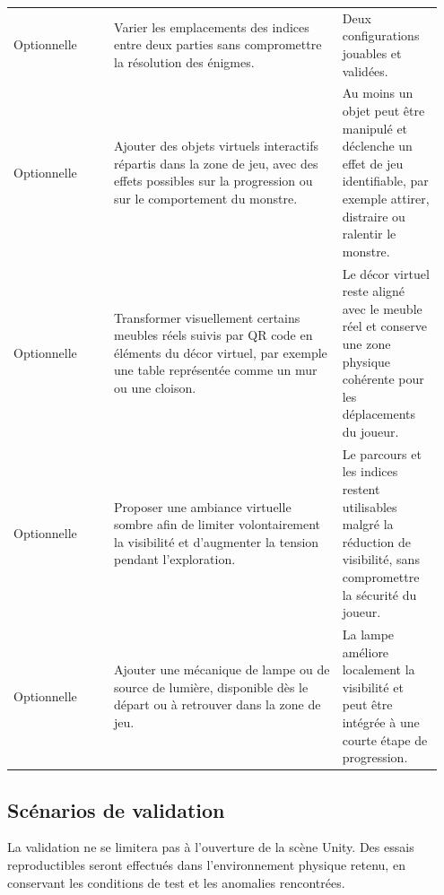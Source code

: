 \documentclass[11pt,a4paper]{article}
\newcommand{\optional}{\textcolor{priorityLow}{Optionnelle}}
\begin{document}
{\begin{longtable}{@{}L{0.222\linewidth}L{0.50\linewidth}L{0.224\linewidth}@{}}
\addlinespace[0.25em]
\optional & Varier les emplacements des indices entre deux parties sans compromettre la résolution des énigmes. & Deux configurations jouables et validées. \\
\addlinespace[0.25em]
\optional & Ajouter des objets virtuels interactifs répartis dans la zone de jeu, avec des effets possibles sur la progression ou sur le comportement du monstre. & Au moins un objet peut être manipulé et déclenche un effet de jeu identifiable, par exemple attirer, distraire ou ralentir le monstre. \\
\addlinespace[0.25em]
\optional & Transformer visuellement certains meubles réels suivis par QR code en éléments du décor virtuel, par exemple une table représentée comme un mur ou une cloison. & Le décor virtuel reste aligné avec le meuble réel et conserve une zone physique cohérente pour les déplacements du joueur. \\
\addlinespace[0.25em]
\optional & Proposer une ambiance virtuelle sombre afin de limiter volontairement la visibilité et d'augmenter la tension pendant l'exploration. & Le parcours et les indices restent utilisables malgré la réduction de visibilité, sans compromettre la sécurité du joueur. \\
\addlinespace[0.25em]
\optional & Ajouter une mécanique de lampe ou de source de lumière, disponible dès le départ ou à retrouver dans la zone de jeu. & La lampe améliore localement la visibilité et peut être intégrée à une courte étape de progression. \\
\bottomrule
\end{longtable}
}

\subsection{Scénarios de validation}

La validation ne se limitera pas à l'ouverture de la scène Unity. Des essais reproductibles seront effectués dans l'environnement physique retenu, en conservant les conditions de test et les anomalies rencontrées.
\end{document}

